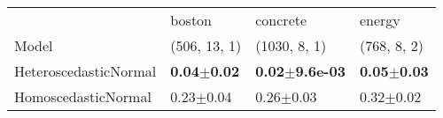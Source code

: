 \begin{tabular}{llll}
\toprule
{} &                           boston &                            concrete &                           energy \\
Model& (506, 13, 1)& (1030, 8, 1)& (768, 8, 2)\\
\midrule
HeteroscedasticNormal &  \textbf{\textbf{0.04$\pm$0.02}} &  \textbf{\textbf{0.02$\pm$9.6e-03}} &  \textbf{\textbf{0.05$\pm$0.03}} \\
HomoscedasticNormal   &                    0.23$\pm$0.04 &                       0.26$\pm$0.03 &                    0.32$\pm$0.02 \\
\bottomrule
\end{tabular}

